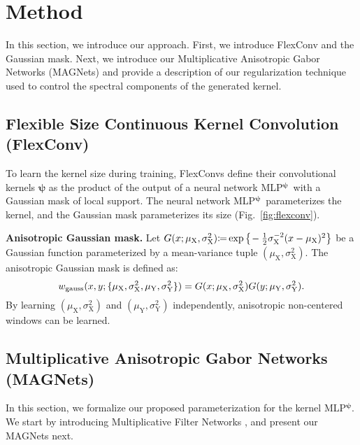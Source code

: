 \documentclass{article} \usepackage{iclr2022_conference,times}
\def\Xt{\mathrm{X}}
\def\Yt{\mathrm{Y}}
\def\bpsi{{\boldsymbol{\psi}}}
\newcommand{\mlp}{{\btt MLP}}
\newcommand{\mlppsi}{\mlp$^{\bpsi}$}
\begin{document}
\section{Method}
\vspace{-2mm}
In this section, we introduce our approach. First, we introduce FlexConv and the Gaussian mask. Next, we introduce our Multiplicative Anisotropic Gabor Networks (MAGNets) and provide a description of our regularization technique used to control the spectral components of the generated kernel.
\vspace{-2mm}
\subsection{Flexible Size Continuous Kernel Convolution (FlexConv)}
\label{sec:flexconv}
\vspace{-2mm}
To learn the kernel size during training, FlexConvs define their convolutional kernels $\boldsymbol{\psi}$ as the product of the output of a neural network \mlppsi\ with a Gaussian mask of local support. The neural network \mlppsi\ parameterizes the kernel, and the Gaussian mask parameterizes its size (Fig.~\ref{fig:flexconv}).

\textbf{Anisotropic Gaussian mask.} Let $G(x ; \mu_{\Xt}, \sigma^2_{\Xt}) {\coloneq} \exp\big\{\hspace{-0.5mm}-\frac{1}{2}\sigma_\Xt^{-2}(x - \mu_{\Xt})^{2}\big\}$ 
be a Gaussian function parameterized by a mean-variance tuple $(\mu_{\Xt}, \sigma^2_{\Xt})$. The anisotropic Gaussian mask is defined as:
\begin{equation}
\setlength{\abovedisplayskip}{3pt}
\setlength{\belowdisplayskip}{3pt}
    w_{\mathrm{gauss}}(x, y; \{\mu_{\Xt}, \sigma^2_{\Xt}, \mu_{\Yt}, \sigma^2_{\Yt}\}) = G(x ; \mu_{\Xt}, \sigma_{\Xt}^2) G(y ; \mu_{\Yt}, \sigma_{\Yt}^2). \label{eq:gaussianmask}
\end{equation}
By learning $(\mu_{\Xt}, \sigma^2_{\Xt})$ and $(\mu_{\Yt}, \sigma^2_{\Yt})$ independently, anisotropic non-centered windows can be learned.


\vspace{-2mm}
\subsection{Multiplicative Anisotropic Gabor Networks (MAGNets)}
\label{sec:magnets}
\vspace{-2mm}
In this section, we formalize our proposed parameterization for the kernel \mlppsi. We start by introducing Multiplicative Filter Networks \citep{fathony2021multiplicative}, and present our MAGNets next.
\end{document}
